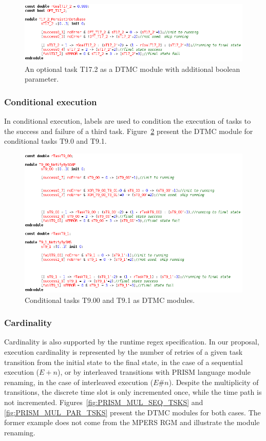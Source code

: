 \begin{figure}[ht!]
\centering
\includegraphics[width=1\textwidth]{imgs/PRISM_OPT_TSK.png}
\caption{An optional task T17.2 as a DTMC module with additional boolean parameter.}
\label{fig:PRISM_OPT_TSK}
\end{figure}

\subsubsection{Conditional execution}

In conditional execution, labels are used to condition the execution of tasks to the success and failure of a third task. Figure~\ref{fig:PRISM_TRY_TSKS} present the DTMC module for conditional tasks T9.0 and T9.1. 

\begin{figure}[ht!]
\centering
\includegraphics[width=1\textwidth]{imgs/PRISM_TRY_TSKS.png}
\caption{Conditional tasks T9.00 and T9.1 as DTMC modules.}
\label{fig:PRISM_TRY_TSKS}
\end{figure}


\subsubsection{Cardinality}

Cardinality is also supported by the runtime regex specification. In our proposal, execution cardinality is represented by the number of retries of a given task transition from the initial state to the final state, in the case of a sequential execution ($E+n$), or by interleaved transitions with PRISM language module renaming, in the case of interleaved execution ($E\#n$). Despite the multiplicity of transitions, the discrete time slot is only incremented once, while the time path is not incremented. Figures~\ref{fig:PRISM_MUL_SEQ_TSKS} and \ref{fig:PRISM_MUL_PAR_TSKS} present the DTMC modules for both cases. The former example does not come from the MPERS RGM and illustrate the module renaming.

